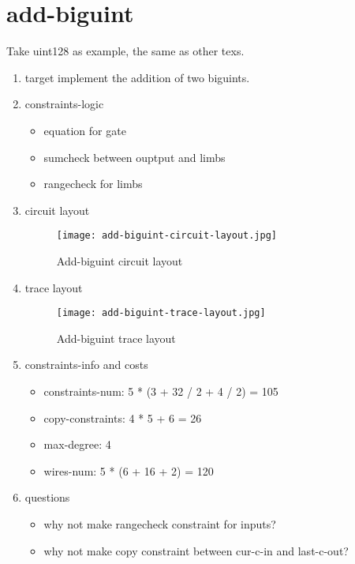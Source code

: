 \section{add-biguint}
\label{add-biguint}

Take uint128 as example, the same as other texs.

\begin{enumerate}
    \item target
        implement the addition of two biguints.
    \item constraints-logic
        \begin{itemize}
            \item equation for gate
            \item sumcheck between ouptput and limbs
            \item rangecheck for limbs
        \end{itemize}
    \item circuit layout
        \begin{figure}[!ht]
            \centering
            \texttt{[image: add-biguint-circuit-layout.jpg]}
            \caption{Add-biguint circuit layout}
            \label{fig:add-biguint-circuit-layout}
        \end{figure}

    \item trace layout
        \begin{figure}[!ht]
            \centering
            \texttt{[image: add-biguint-trace-layout.jpg]}
            \caption{Add-biguint trace layout}
            \label{fig:add-biguint-trace-layout}
        \end{figure}
    
    \item constraints-info and costs
        \begin{itemize}
            \item constraints-num: 5 * (3 + 32 / 2 + 4 / 2) = 105
            \item copy-constraints: 4 * 5 + 6 = 26
            \item max-degree: 4
            \item wires-num: 5 * (6 + 16 + 2) = 120
        \end{itemize}

    \item questions
        \begin{itemize}
            \item why not make rangecheck constraint for inputs?
            \item why not make copy constraint between cur-c-in and last-c-out?
        \end{itemize}

\end{enumerate}